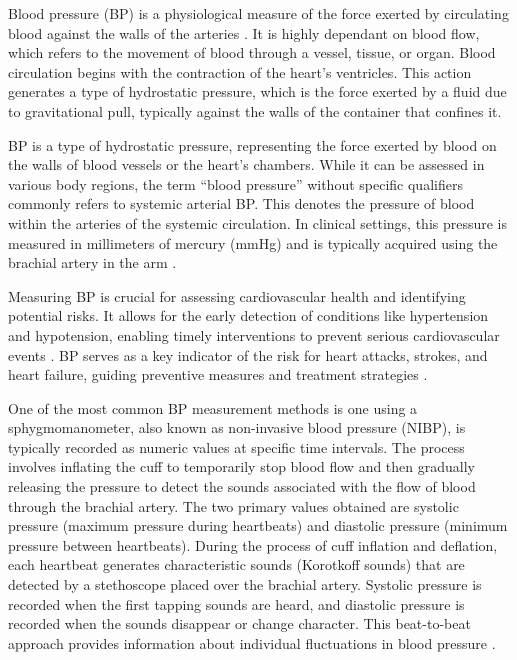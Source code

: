 \documentclass[12pt, bibliography=totoc]{scrartcl}
\begin{document}
Blood pressure (BP) is a physiological measure of the force exerted by circulating blood against the walls of the arteries \cite{WhatBloodPressure2019}.
It is highly dependant on blood flow, which refers to the movement of blood through a vessel, tissue, or organ.
Blood circulation begins with the contraction of the heart's ventricles.
This action generates a type of hydrostatic pressure, which is the force exerted by a fluid due to gravitational pull, typically against the walls of the container that confines it.

BP is a type of hydrostatic pressure, representing the force exerted by blood on the walls of blood vessels or the heart's chambers.
While it can be assessed in various body regions, the term \enquote{blood pressure} without specific qualifiers commonly refers to systemic arterial BP.
This denotes the pressure of blood within the arteries of the systemic circulation.
In clinical settings, this pressure is measured in millimeters of mercury (mmHg) and is typically acquired using the brachial artery in the arm \cite{betts20BloodFlow2022}.

Measuring BP is crucial for assessing cardiovascular health and identifying potential risks. It allows for the early detection of conditions like hypertension and hypotension, enabling timely interventions to prevent serious cardiovascular events \cite{naylorArterialCathetersEarly2020}. BP serves as a key indicator of the risk for heart attacks, strokes, and heart failure, guiding preventive measures and treatment strategies \cite{ettehadBloodPressureLowering2016}.

One of the most common BP measurement methods is one using a sphygmomanometer, also known as non-invasive blood pressure (NIBP), is typically recorded as numeric values at specific time intervals.
The process involves inflating the cuff to temporarily stop blood flow and then gradually releasing the pressure to detect the sounds associated with the flow of blood through the brachial artery.
The two primary values obtained are systolic pressure (maximum pressure during heartbeats) and diastolic pressure (minimum pressure between heartbeats).
During the process of cuff inflation and deflation, each heartbeat generates characteristic sounds (Korotkoff sounds) that are detected by a stethoscope placed over the brachial artery.
Systolic pressure is recorded when the first tapping sounds are heard, and diastolic pressure is recorded when the sounds disappear or change character.
This beat-to-beat approach provides information about individual fluctuations in blood pressure \cite{betts20BloodFlow2022}.
\end{document}
